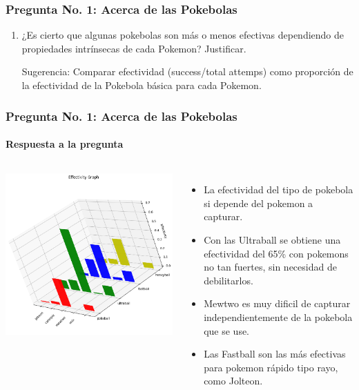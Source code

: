 \documentclass[aspectratio=169]{beamer}
\begin{document}
\begin{frame}
\frametitle{Pregunta No. 1: Acerca de las Pokebolas}
\begin{enumerate}[label=\emph{\alph*}), resume*=l_after]
\item ¿Es cierto que algunas pokebolas son más o menos efectivas dependiendo de propiedades intrínsecas de cada Pokemon? Justificar.

\vspace{.5mm}
Sugerencia: Comparar efectividad (success/total attemps) como proporción de la efectividad de la Pokebola básica para cada Pokemon.
\end{enumerate}
\end{frame}
\begin{frame}
\frametitle{Pregunta No. 1: Acerca de las Pokebolas}
\framesubtitle{Respuesta a la pregunta}

\begin{columns}
\includegraphics[scale=.352]{Figures/output_1b.png}
\begin{itemize}
\item La efectividad del tipo de pokebola si depende del pokemon a capturar.
\item Con las Ultraball se obtiene una efectividad del 65\% con pokemons no tan fuertes, sin necesidad de debilitarlos.
\item Mewtwo es muy dificil de capturar independientemente de la pokebola que se use.
\item Las Fastball son las más efectivas para pokemon rápido tipo rayo, como Jolteon.
\end{itemize}
\end{columns}
\end{frame}
\end{document}
